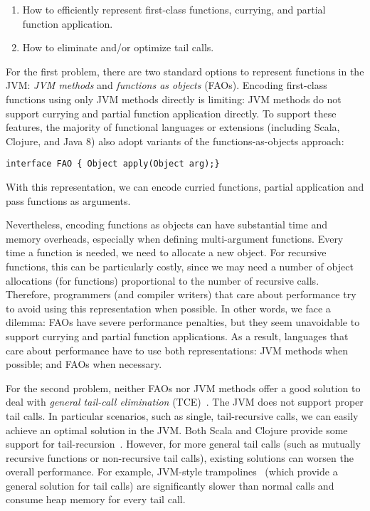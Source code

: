 \begin{enumerate}

\item How to efficiently represent first-class functions, currying, and 
partial function application.

\item How to eliminate and/or optimize tail calls.

\end{enumerate}

For the first problem,
there are two standard options to represent functions in the JVM: \emph{JVM methods} and 
\emph{functions as objects} (FAOs).
Encoding first-class functions using only JVM methods directly is
limiting: JVM methods do not support currying and partial function
application directly. 
To support these features, the majority of functional languages or extensions (including Scala,
Clojure, and Java 8) also adopt variants of the functions-as-objects
approach: 

\begin{lstlisting}
interface FAO { Object apply(Object arg);}
\end{lstlisting}

\noindent With this representation,
we can encode curried functions, partial application and 
pass functions as arguments.

Nevertheless, encoding functions as objects can have substantial time and memory overheads,
especially when defining multi-argument
functions. Every time a function is needed, we need to
allocate a new object. For recursive functions, this can be
particularly costly, since we may need a number of object allocations
(for functions) proportional to the number of recursive calls.
Therefore, programmers (and compiler writers) that care about
performance try to avoid using this representation when possible.  In
other words, we face a dilemma: FAOs have severe performance
penalties, but they seem unavoidable to support currying and partial function
applications. As a result, languages that care about performance have to
use both representations: JVM methods when possible; and FAOs when
necessary.

For the second problem, neither FAOs nor JVM methods offer a good solution to
deal with \emph{general tail-call elimination}
(TCE)~\cite{Steele1977}. The JVM does not support proper tail calls.
In particular scenarios, such as single, tail-recursive calls, we can
easily achieve an optimal solution in the JVM.  Both Scala and Clojure
provide some support for tail-recursion~\cite{Odersky2014b,recur}.
However, for more general tail calls (such as mutually recursive
functions or non-recursive tail calls), existing solutions can worsen
the overall performance. For example, JVM-style trampolines~\cite{Schinz2001}
(which provide a general solution for tail calls) are significantly
slower than normal calls and consume heap memory for every tail call.

